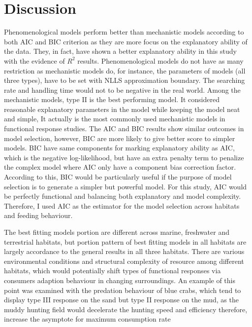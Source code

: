 \documentclass[11pt, a4paper]{article}
\begin{document}
\section{Discussion}
Phenomenological models perform better than mechanistic models according to both AIC and BIC criterion as they are more focus on the explanatory ability of the data. They, in fact, have shown a  better explanatory ability in this study with the evidence of $ R^{2} $ results.  Phenomenological models do not have as many restriction as mechanistic models do, for instance, the parameters of  models (all three types), have to be set with NLLS approximation boundary. The searching rate and handling time would not to be negative in the real world. Among the mechanistic models, type II is  the best performing model. It considered reasonable explanatory parameters in the model while keeping the model neat and simple, It actually is the most commonly used mechanistic  models in functional response studies\cite{Jeschke2002}.
The AIC and BIC results show similar outcomes in model selection, however, BIC are more likely to give better score to simpler models. BIC have same components for marking explanatory ability as AIC, which is the negative log-likelihood, but have an extra penalty term to penalize the complex model where AIC only have a component bias correction factor\cite{Johnson2004}. According to this, BIC would be particularly useful if the purpose of model selection is to generate a simpler but powerful model. For this study, AIC would be perfectly functional and balancing both explanatory and model complexity. Therefore, I used AIC as the estimator for the model selection across habitats and feeding behaviour.

The best fitting models portion are different across marine, freshwater and terrestrial  habitats, but portion pattern of best fitting models in all habitats are largely accordance to the general results in all three habitats. There are various environmental conditions and structural complexity of resource  among different habitats, which would potentially shift types of functional responses via consumers adaption behaviour in changing surroundings. An example of this point was examined with the predation behaviour of blue crabs, which tend to display type III response on the sand but type II response on the mud, as the muddy hunting field would decelerate the hunting speed and efficiency therefore, increase the asymptote for maximum consumption rate\cite{Lipcius1986}
\end{document}
